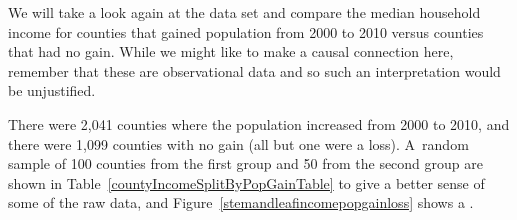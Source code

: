 We will take a look again at the  data set and compare the median household income for counties that gained population from 2000 to 2010 versus counties that had no gain. While we might like to make a causal connection here, remember that these are observational data and so such an interpretation would be unjustified.

There were 2,041 counties where the population increased from 2000 to 2010, and there were 1,099 counties with no gain (all but one were a loss). A~random sample of 100 counties from the first group and 50 from the second group are shown in Table~\ref{countyIncomeSplitByPopGainTable} to give a better sense of some of the raw data, and Figure~\ref{stemandleafincomepopgainloss} shows a .

